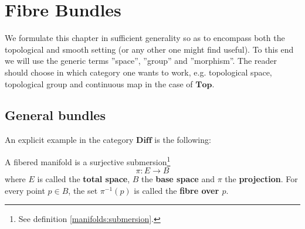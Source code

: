 \chapter{Fibre Bundles}\label{chapter:bundles}

    We formulate this chapter in sufficient generality so as to encompass both the topological and smooth setting (or any other one might find useful). To this end we will use the generic terms ''space'', ''group'' and ''morphism''. The reader should choose in which category one wants to work, e.g. topological space, topological group and continuous map in the case of $\mathbf{Top}$.

\section{General bundles}


    An explicit example in the category $\mathbf{Diff}$ is the following:
    \begin{example}
        A fibered manifold is a surjective submersion\footnote{See definition \ref{manifolds:submersion}.} \[\pi:E\rightarrow B\] where $E$ is called the \textbf{total space}, $B$ the \textbf{base space} and $\pi$ the \textbf{projection}. For every point $p\in B$, the set $\pi^{-1}(p)$ is called the \textbf{fibre over $p$}.
    \end{example}

